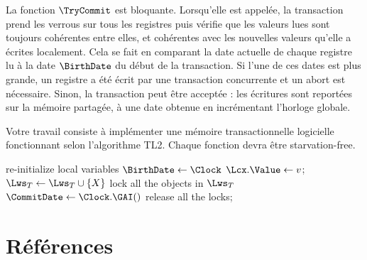 \documentclass{td}
\begin{document}
La fonction $\TryCommit$ est bloquante. Lorsqu'elle est appelée, la transaction prend les verrous
sur tous les registres puis vérifie que les valeurs lues sont toujours
cohérentes entre elles, et cohérentes avec les nouvelles valeurs qu'elle a écrites localement.
Cela se fait en comparant la date actuelle de chaque registre lu à la date $\BirthDate$
du début de la transaction. Si l'une de ces dates est plus grande, un registre a été écrit
par une transaction concurrente et un abort est nécessaire.
Sinon, la transaction peut être acceptée : les écritures sont reportées sur la mémoire partagée,
à une date obtenue en incrémentant l'horloge globale.

Votre travail consiste à implémenter une mémoire transactionnelle logicielle fonctionnant selon l'algorithme TL2. Chaque fonction devra être starvation-free. 

\begin{algorithm}[t]
   {
    re-initialize local variables\;
    $\BirthDate \leftarrow \Clock$\;
  }
   {
    $\Lcx.\Value \leftarrow v$; 
    $\Lws_T\leftarrow \Lws_T \cup \{X\}$\;
  }
   {
  }
   {
    lock all the objects in $\Lws_T$\;
    $\CommitDate \leftarrow \Clock.\GAI()$\label{al:incr}\;
    release all the locks;
  }
  \caption{Algorithme TL2}
  \label{algo:TL2}
\end{algorithm}

\section{Références}

\renewcommand{\section}[2]{}%
\end{document}
